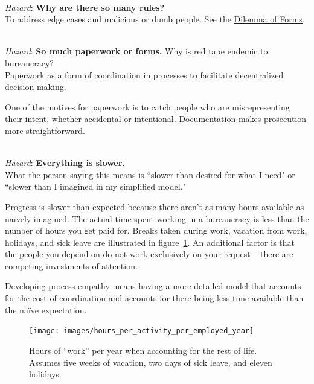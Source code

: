 \ \\
\textit{Hazard}: \textbf{Why are there so many rules?}\\
To address edge cases and malicious or dumb people. See the \hyperref[table:dilemma-subject-forms]{Dilemma of Forms}.

\ \\
\textit{Hazard}: \textbf{So much paperwork or forms.}
Why is red tape endemic to bureaucracy?\\
Paperwork as a form of coordination in processes to facilitate decentralized decision-making. 

One of the motives for paperwork is to catch people who are misrepresenting their intent, whether accidental or intentional. Documentation makes prosecution more straightforward.

\ \\
\textit{Hazard}: \textbf{Everything is slower.}\\
What the person saying this means is ``slower than desired for what I need" or ``slower than I imagined in my simplified model."

Progress is slower than expected because there aren't as many hours available as na\"ively imagined. The actual time spent working in a bureaucracy is less than the number of hours you get paid for. Breaks taken during work, vacation from work, holidays, and sick leave are illustrated in figure~\ref{fig:hours_per_year}. An additional factor is that the people you depend on do not work exclusively on your request -- there are competing investments of attention. 

Developing \gls{process empathy} means having a more detailed model that accounts for the cost of coordination and accounts for there being less time available than the na\"ive expectation. 


\begin{figure}[!htb] %
    \centering
    \texttt{[image: images/hours\_per\_activity\_per\_employed\_year]}
    \caption{Hours of ``work'' per year when accounting for the rest of life. Assumes five weeks of vacation, two days of sick leave, and eleven holidays.}
    \label{fig:hours_per_year}
\end{figure}

